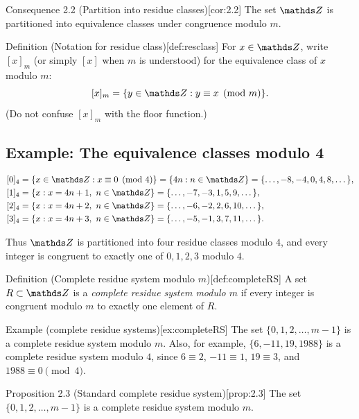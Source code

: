 \documentclass[10pt]{article}
\theoremstyle{definition}
\theoremstyle{plain}
\numberwithin{equation}{section}
\begin{document}
\begin{define}{Consequence 2.2 (Partition into residue classes)}[cor:2.2]
The set $\setZ$ is partitioned into equivalence classes under congruence modulo $m$.
\end{define}

\begin{define}{Definition (Notation for residue class)}[def:resclass]
For $x\in\setZ$, write $[x]_m$ (or simply $[x]$ when $m$ is understood) for the
equivalence class of $x$ modulo $m$:
\[
[x]_m=\{y\in\setZ: y\equiv x\pmod{m}\}.
\]
(Do not confuse $[x]_m$ with the floor function.)
\end{define}

\subsection*{Example: The equivalence classes modulo 4}

\[
\begin{aligned}
[0]_4 &=\{x\in\setZ: x\equiv 0\pmod{4}\}=\{4n: n\in\setZ\}=\{\dots,-8,-4,0,4,8,\dots\},\\
[1]_4 &=\{x: x=4n+1,\ n\in\setZ\}=\{\dots,-7,-3,1,5,9,\dots\},\\
[2]_4 &=\{x: x=4n+2,\ n\in\setZ\}=\{\dots,-6,-2,2,6,10,\dots\},\\
[3]_4 &=\{x: x=4n+3,\ n\in\setZ\}=\{\dots,-5,-1,3,7,11,\dots\}.
\end{aligned}
\]

Thus $\setZ$ is partitioned into four residue classes modulo $4$, and every integer is
congruent to exactly one of $0,1,2,3$ modulo $4$.

\begin{define}{Definition (Complete residue system modulo $m$)}[def:completeRS]
A set $R\subset\setZ$ is a \emph{complete residue system modulo $m$} if every integer
is congruent modulo $m$ to exactly one element of $R$.
\end{define}

\begin{define}{Example (complete residue systems)}[ex:completeRS]
The set $\{0,1,2,\dots,m-1\}$ is a complete residue system modulo $m$. Also, for example,
$\{6,-11,19,1988\}$ is a complete residue system modulo $4$, since
$6\equiv 2$, $-11\equiv 1$, $19\equiv 3$, and $1988\equiv 0\pmod{4}$.
\end{define}

\begin{define}{Proposition 2.3 (Standard complete residue system)}[prop:2.3]
The set $\{0,1,2,\dots,m-1\}$ is a complete residue system modulo $m$.
\end{define}
\end{document}
